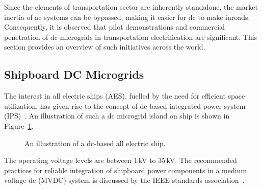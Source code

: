 \documentclass[10pt]{IETBook}
\begin{document}
Since the elements of transportation sector are inherently standalone, the market inertia of ac systems can be bypassed, making it easier for dc to make inroads. Consequently, it is observed that pilot demonstrations and commercial penetration of dc microgrids in transportation electrification are significant. This section provides an overview of such initiatives across the world.
\subsection{Shipboard DC Microgrids}
The interest in all electric ships (AES), fuelled by the need for efficient space utilization, has given rise to the concept of dc based integrated power system (IPS)~\cite{alb}. An illustration of such a dc microgrid island on ship is shown in Figure~\ref{shipillus}.
\begin{figure}[!h]
\centerline{}
\caption{An illustration of a dc-based all electric ship.}
\label{shipillus}
\end{figure}

The operating voltage levels are between 1\,kV to 35\,kV. The recommended practices for reliable integration of shipboard power components in a medium voltage dc (MVDC) system is discussed by the IEEE standards association~\cite{ieee}. 
\end{document}
